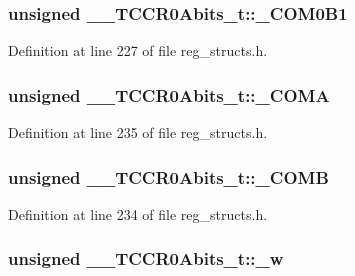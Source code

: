 \hypertarget{union_____t_c_c_r0_abits__t_a03008a643fada314ca27366e5488f8cb}{
\subsubsection[{\+\_\+\+C\+O\+M0\+B1}]{\setlength{\rightskip}{0pt plus 5cm}unsigned \+\_\+\+\_\+\+T\+C\+C\+R0\+Abits\+\_\+t\+::\+\_\+\+C\+O\+M0\+B1}}\label{union_____t_c_c_r0_abits__t_a03008a643fada314ca27366e5488f8cb}


Definition at line 227 of file reg\+\_\+structs.\+h.

\hypertarget{union_____t_c_c_r0_abits__t_a10b1544a9467af76d882676763868565}{
\subsubsection[{\+\_\+\+C\+O\+M\+A}]{\setlength{\rightskip}{0pt plus 5cm}unsigned \+\_\+\+\_\+\+T\+C\+C\+R0\+Abits\+\_\+t\+::\+\_\+\+C\+O\+M\+A}}\label{union_____t_c_c_r0_abits__t_a10b1544a9467af76d882676763868565}


Definition at line 235 of file reg\+\_\+structs.\+h.

\hypertarget{union_____t_c_c_r0_abits__t_a290f9b48dbc9095cdc443830d0cc38f3}{
\subsubsection[{\+\_\+\+C\+O\+M\+B}]{\setlength{\rightskip}{0pt plus 5cm}unsigned \+\_\+\+\_\+\+T\+C\+C\+R0\+Abits\+\_\+t\+::\+\_\+\+C\+O\+M\+B}}\label{union_____t_c_c_r0_abits__t_a290f9b48dbc9095cdc443830d0cc38f3}


Definition at line 234 of file reg\+\_\+structs.\+h.

\hypertarget{union_____t_c_c_r0_abits__t_a0f01e47a94cde3b404ee5e5a42e99389}{
\subsubsection[{\+\_\+w}]{\setlength{\rightskip}{0pt plus 5cm}unsigned \+\_\+\+\_\+\+T\+C\+C\+R0\+Abits\+\_\+t\+::\+\_\+w}}\label{union_____t_c_c_r0_abits__t_a0f01e47a94cde3b404ee5e5a42e99389}



